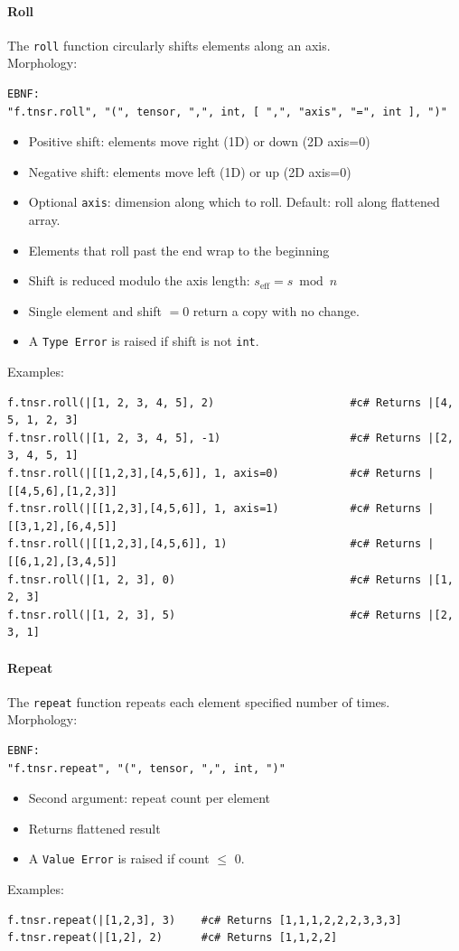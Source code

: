 \paragraph{Roll}
The \texttt{roll} function circularly shifts elements along an axis.\\
Morphology:
\begin{verbatim}
EBNF:
"f.tnsr.roll", "(", tensor, ",", int, [ ",", "axis", "=", int ], ")"
\end{verbatim}
\begin{itemize}
\item Positive shift: elements move right (1D) or down (2D axis=0)
\item Negative shift: elements move left (1D) or up (2D axis=0)
\item Optional \texttt{axis}: dimension along which to roll. Default: roll along flattened array.
\item Elements that roll past the end wrap to the beginning
\item Shift is reduced modulo the axis length: $s_{\text{eff}} = s \bmod n$
\item Single element and shift $= 0$ return a copy with no change.
\item A \texttt{Type Error} is raised if shift is not \texttt{int}.
\end{itemize}
Examples:
\begin{verbatim}
f.tnsr.roll(|[1, 2, 3, 4, 5], 2)                     #c# Returns |[4, 5, 1, 2, 3]
f.tnsr.roll(|[1, 2, 3, 4, 5], -1)                    #c# Returns |[2, 3, 4, 5, 1]
f.tnsr.roll(|[[1,2,3],[4,5,6]], 1, axis=0)           #c# Returns |[[4,5,6],[1,2,3]]
f.tnsr.roll(|[[1,2,3],[4,5,6]], 1, axis=1)           #c# Returns |[[3,1,2],[6,4,5]]
f.tnsr.roll(|[[1,2,3],[4,5,6]], 1)                   #c# Returns |[[6,1,2],[3,4,5]]
f.tnsr.roll(|[1, 2, 3], 0)                           #c# Returns |[1, 2, 3]
f.tnsr.roll(|[1, 2, 3], 5)                           #c# Returns |[2, 3, 1]
\end{verbatim}

\paragraph{Repeat}
The \texttt{repeat} function repeats each element specified number of times.\\
Morphology:
\begin{verbatim}
EBNF:
"f.tnsr.repeat", "(", tensor, ",", int, ")"
\end{verbatim}
\begin{itemize}
\item Second argument: repeat count per element
\item Returns flattened result
\item A \texttt{Value Error} is raised if count $\leq$ 0.
\end{itemize}
Examples:
\begin{verbatim}
f.tnsr.repeat(|[1,2,3], 3)    #c# Returns [1,1,1,2,2,2,3,3,3]
f.tnsr.repeat(|[1,2], 2)      #c# Returns [1,1,2,2]
\end{verbatim}

